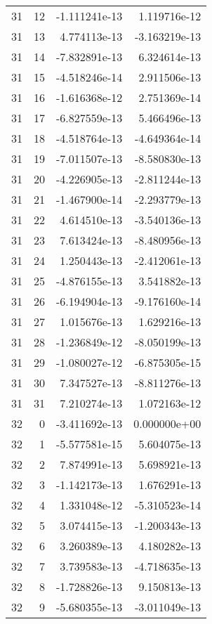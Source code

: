 \begin{tabular}{rrrr}
  31 &   12 & -1.111241e-13 &  1.119716e-12 \\
  31 &   13 &  4.774113e-13 & -3.163219e-13 \\
  31 &   14 & -7.832891e-13 &  6.324614e-13 \\
  31 &   15 & -4.518246e-14 &  2.911506e-13 \\
  31 &   16 & -1.616368e-12 &  2.751369e-14 \\
  31 &   17 & -6.827559e-13 &  5.466496e-13 \\
  31 &   18 & -4.518764e-13 & -4.649364e-14 \\
  31 &   19 & -7.011507e-13 & -8.580830e-13 \\
  31 &   20 & -4.226905e-13 & -2.811244e-13 \\
  31 &   21 & -1.467900e-14 & -2.293779e-13 \\
  31 &   22 &  4.614510e-13 & -3.540136e-13 \\
  31 &   23 &  7.613424e-13 & -8.480956e-13 \\
  31 &   24 &  1.250443e-13 & -2.412061e-13 \\
  31 &   25 & -4.876155e-13 &  3.541882e-13 \\
  31 &   26 & -6.194904e-13 & -9.176160e-14 \\
  31 &   27 &  1.015676e-13 &  1.629216e-13 \\
  31 &   28 & -1.236849e-12 & -8.050199e-13 \\
  31 &   29 & -1.080027e-12 & -6.875305e-15 \\
  31 &   30 &  7.347527e-13 & -8.811276e-13 \\
  31 &   31 &  7.210274e-13 &  1.072163e-12 \\
  32 &    0 & -3.411692e-13 &  0.000000e+00 \\
  32 &    1 & -5.577581e-15 &  5.604075e-13 \\
  32 &    2 &  7.874991e-13 &  5.698921e-13 \\
  32 &    3 & -1.142173e-13 &  1.676291e-13 \\
  32 &    4 &  1.331048e-12 & -5.310523e-14 \\
  32 &    5 &  3.074415e-13 & -1.200343e-13 \\
  32 &    6 &  3.260389e-13 &  4.180282e-13 \\
  32 &    7 &  3.739583e-13 & -4.718635e-13 \\
  32 &    8 & -1.728826e-13 &  9.150813e-13 \\
  32 &    9 & -5.680355e-13 & -3.011049e-13 \\

\end{tabular}
